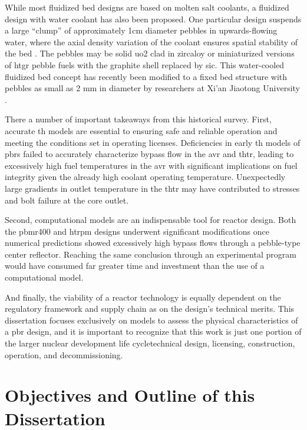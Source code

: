 While most fluidized bed designs are based on molten salt coolants, a fluidized design with water coolant has also been proposed. One particular design suspends a large ``clump'' of approximately 1\si{\centi\meter} diameter pebbles in upwards-flowing water, where the axial density variation of the coolant ensures spatial stability of the bed \cite{sefidvash, sefidvash_1996}. The pebbles may be solid \gls{uo2} clad in zircaloy or miniaturized versions of \gls{htgr} pebble fuels with the graphite shell replaced by \gls{sic}. This water-cooled fluidized bed concept has recently been modified to a fixed bed structure with pebbles as small as 2 \si{\milli\meter} in diameter by researchers at Xi'an Jiaotong University \cite{cai,li_pbwr}.

There a number of important takeaways from this historical survey. First, accurate \gls{th} models are essential to ensuring safe and reliable operation and meeting the conditions set in operating licenses. Deficiencies in early \gls{th} models of \glspl{pbr} failed to accurately characterize bypass flow in the \gls{avr} and \gls{thtr}, leading to excessively high fuel temperatures in the \gls{avr} with significant implications on fuel integrity given the already high coolant operating temperature. Unexpectedly large gradients in outlet temperature in the \gls{thtr} may have contributed to stresses and bolt failure at the core outlet.

Second, computational models are an indispensable tool for reactor design. Both the \gls{pbmr400} and \gls{htrpm} designs underwent significant modifications once numerical predictions showed excessively high bypass flows through a pebble-type center reflector. Reaching the same conclusion through an experimental program would have consumed far greater time and investment than the use of a computational model.

And finally, the viability of a reactor technology is equally dependent on the regulatory framework and supply chain as on the design's technical merits. This dissertation focuses exclusively on models to assess the physical characteristics of a \gls{pbr} design, and it is important to recognize that this work is just one portion of the larger nuclear development life cycle\mdash technical design, licensing, construction, operation, and decommissioning. 

\section{Objectives and Outline of this Dissertation}
\label{sec:outline}

